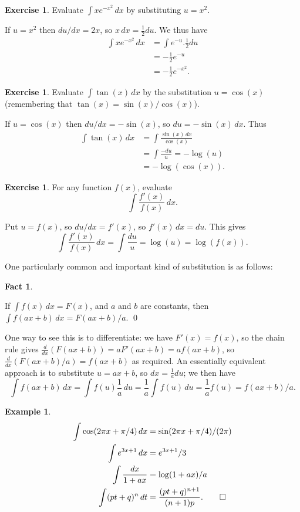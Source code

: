 \documentclass[a4paper]{book}
\renewcommand{\:}{\colon}
\newcommand{\bilabel}[1]{\hypertarget{#1}{\label{#1}}}
\theoremstyle{definition}
\newtheorem{fact}[theorem]{Fact}
\newtheorem{example}[theorem]{Example}
\newtheorem{exercise}[theorem]{Exercise}
\renewenvironment{solution}{\SolutionInline}{\endSolutionInline}
\begin{document}
\begin{exercise}
 Evaluate $\int xe^{-x^2}\,dx$ by substituting $u=x^2$.
\end{exercise}
\begin{solution}
 If $u=x^2$ then $du/dx=2x$, so $x\,dx=\frac{1}{2}du$.  We thus have
 \begin{align*}
  \int xe^{-x^2}\,dx &= \int e^{-u}.\tfrac{1}{2}du \\ 
                     &= -\tfrac{1}{2}e^{-u} \\
                     &= -\tfrac{1}{2}e^{-x^2}.
 \end{align*}
\end{solution}

\begin{exercise}
 Evaluate $\int\tan(x)\,dx$ by the substitution $u=\cos(x)$
 (remembering that $\tan(x)=\sin(x)/\cos(x)$).
\end{exercise}
\begin{solution}
 If $u=\cos(x)$ then $du/dx=-\sin(x)$, so $du=-\sin(x)\,dx$.  Thus
 \begin{align*}
  \int\tan(x)\,dx &= \int\frac{\sin(x)\,dx}{\cos(x)} \\
                  &= \int\frac{-du}{u} = -\log(u) \\
                  &= -\log(\cos(x)).
 \end{align*}
\end{solution}

\begin{exercise}
 For any function $f(x)$, evaluate
 \[ \int \frac{f'(x)}{f(x)}\,dx. \]
\end{exercise}
\begin{solution}
 Put $u=f(x)$, so $du/dx=f'(x)$, so $f'(x)\,dx=du$.  This gives 
 \[ \int \frac{f'(x)}{f(x)}\,dx = 
     \int \frac{du}{u} = \log(u) = \log(f(x)).
 \]
\end{solution}


One particularly common and important kind of substitution is as
follows:
\begin{fact}\bilabel{fact-aff-subs}
 If $\int f(x)\,dx=F(x)$, and $a$ and $b$ are constants, then
 $\int f(ax+b)\,dx=F(ax+b)/a$. \qed
\end{fact}
One way to see this is to differentiate: we have $F'(x)=f(x)$, so the
chain rule gives $\frac{d}{dx}(F(ax+b))=aF'(ax+b)=af(ax+b)$, so 
$\frac{d}{dx}(F(ax+b)/a)=f(ax+b)$ as required.  An essentially
equivalent approach is to substitute $u=ax+b$, so $dx=\frac{1}{a}du$;
we then have
\[ \int f(ax+b)\,dx = \int f(u)\frac{1}{a}\,du = 
    \frac{1}{a}\int f(u)\,du = \frac{1}{a}f(u) = f(ax+b)/a.
\]
\begin{example}
 \begin{align*}
  \int \cos(2\pi x + \pi/4)\,dx &= \sin(2\pi x+\pi/4)/(2\pi) \\
  \int e^{3x+1}\,dx &= e^{3x+1}/3 \\
  \int \frac{dx}{1+ax} &= \log(1+ax)/a \\
  \int (pt+q)^n\,dt &= \frac{(pt+q)^{n+1}}{(n+1)p}.  \qed
 \end{align*}
\end{example}
\end{document}
